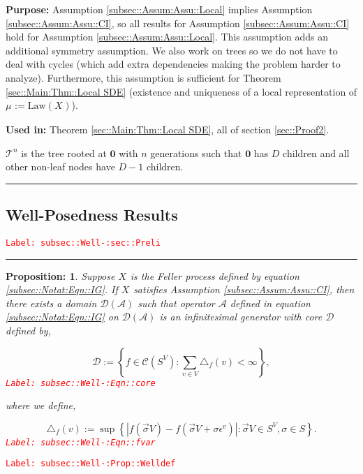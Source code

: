 \documentclass[12pt]{article}
\newcommand{\mc}{\mathcal}
\newcommand{\te}{\text}
\newcommand{\ep}{\epsilon}
\newcommand{\tr}{\textcolor{red}}
\newcommand{\labe}[1]{\tr{\texttt{Label: #1}}}
\newcommand{\purpose}{\textbf{Purpose: }}
\newcommand{\usein}{\textbf{Used in: }}
\newcommand{\ind}{\hspace{24pt}}
\newcommand{\lin}{\rule{\linewidth}{0.4 pt}}
\newcommand{\defeq}{:=}								%
\renewcommand{\root}{\mathbf{0}}				%
\renewcommand{\v}{v}							%
\renewcommand{\S}{S}							%
\newcommand{\s}{\sigma}							%
\newcommand{\sv}{\vec{\s}}						%
\newcommand{\ev}[1]{\ep^{#1}}					%
\newcommand{\degr}{D}								%
\newcommand{\IG}{\mc{A}}						%
\newcommand{\law}{\te{Law}}							%
\newcommand{\tree}{\mc{T}}							%
\newcommand{\core}{\mc{D}}							%
\newcommand{\V}{V}									%
\newcommand{\numb}{n}								%
\newcommand{\XState}[1]{\S^{#1}}				%
\newcommand{\rxvts}[2]{X_{#1}{#2}}					%
\newcommand{\m}[3]{\mu_{#2#1}^{#3}}						%
\newcommand{\cont}{\mc{C}}							%
\newtheorem{prop}[thms]{Proposition: }
\begin{document}
\purpose Assumption \ref{subsec::Assum:Assu::Local} implies Assumption \ref{subsec::Assum:Assu::CI}, so all results for Assumption \ref{subsec::Assum:Assu::CI} hold for Assumption \ref{subsec::Assum:Assu::Local}. This assumption adds an additional symmetry assumption. We also work on trees so we do not have to deal with cycles (which add extra dependencies making the problem harder to analyze). Furthermore, this assumption is sufficient for Theorem \ref{sec::Main:Thm::Local SDE} (existence and uniqueness of a local representation of \(\m{}{}{} \defeq \law(\rxvts{}{})\)).

\usein Theorem \ref{sec::Main:Thm::Local SDE}, all of section \ref{sec::Proof2}.

\ind \(\tree^\numb\) is the tree rooted at \(\root\) with \(\numb\) generations such that \(\root\) has \(\degr\) children and all other non-leaf nodes have \(\degr-1\) children.

\lin

\subsection{Well-Posedness Results}
\label{subsec::Well-:sec::Preli}\labe{subsec::Well-:sec::Preli}

\rule{\linewidth}{0.4 pt}

\begin{prop}
Suppose \(\rxvts{}{}\) is the Feller process defined by equation \eqref{subsec::Notat:Eqn::IG}. If \(\rxvts{}{}\) satisfies Assumption \ref{subsec::Assum:Assu::CI}, then there exists a domain \(\core(\IG)\) such that operator \(\IG\) defined in equation \eqref{subsec::Notat:Eqn::IG} on \(\mc{D}(\IG)\) is an infinitesimal generator with core \(\core\) defined by,

\begin{equation}
\core \defeq \left\{f \in \cont(\S^\V): \sum_{\v\in\V} \triangle_f(\v) < \infty\right\},
\label{subsec::Well-:Eqn::core}
\end{equation}
\labe{subsec::Well-:Eqn::core}

where we define,

\begin{equation}
\triangle_f(\v) \defeq \sup\left\{|f(\sv{}{\V}) - f(\sv{}{\V}+\s\ev{\v})|: \sv{}{\V} \in \S^\V,\s \in \S\right\}.
\label{subsec::Well-:Eqn::fvar}
\end{equation}
\labe{subsec::Well-:Eqn::fvar}

\label{subsec::Well-:Prop::Welldef}
\end{prop}
\labe{subsec::Well-:Prop::Welldef}
\end{document}
